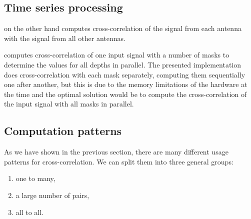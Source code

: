 \subsection{Time series processing}

\citet{Clark2011} on the other hand computes cross-correlation of the signal from each antenna with the signal from all other antennas.


\citet{Kapinchev2015} computes cross-correlation of one input signal with a number of masks to determine the values for all depths in parallel. The presented implementation does cross-correlation with each mask separately, computing them sequentially one after another, but this is due to the memory limitations of the hardware at the time and the optimal solution would be to compute the cross-correlation of the input signal with all masks in parallel.

\subsection{Computation patterns}
As we have shown in the previous section, there are many different usage patterns for cross-correlation. We can split them into three general groups:

\begin{enumerate}
	\item one to many,
	\item a large number of pairs,
	\item all to all.
\end{enumerate} 


